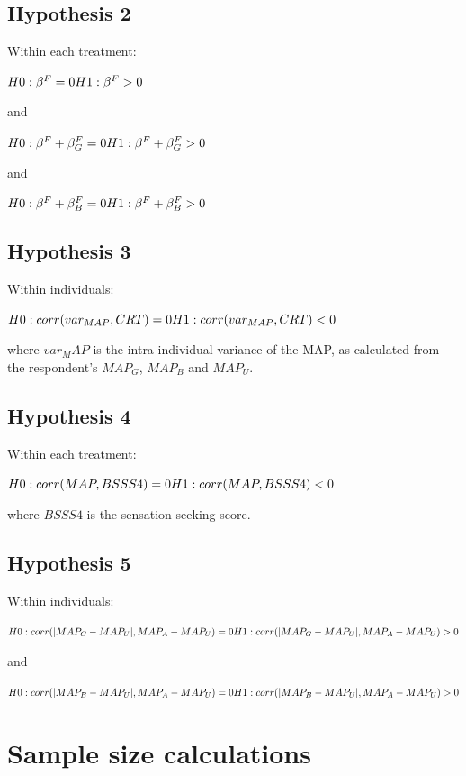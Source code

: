 \subsection{Hypothesis 2}
Within each treatment:

\noindent $H0: \beta^F = 0 \\
H1: \beta^F > 0$

\noindent and

\noindent $H0: \beta^F + \beta_G^F = 0 \\
H1: \beta^F + \beta_G^F > 0$

\noindent and

\noindent $H0: \beta^F + \beta_B^F = 0 \\
H1: \beta^F + \beta_B^F > 0$

\subsection{Hypothesis 3}
Within individuals:

\noindent $H0: corr(var_{MAP},CRT) = 0 \\
H1: corr(var_{MAP},CRT) < 0$

\noindent where $var_MAP$ is the intra-individual variance of the MAP, as calculated from the respondent's $MAP_G$, $MAP_B$ and $MAP_U$.

\subsection{Hypothesis 4}
Within each treatment:

\noindent $H0: corr(MAP,BSSS4) = 0 \\
H1: corr(MAP,BSSS4) < 0$

\noindent where $BSSS4$ is the sensation seeking score.

\subsection{Hypothesis 5}
Within individuals:

\noindent $H0: corr(|MAP_G - MAP_U|,MAP_A - MAP_U) = 0 \\
H1: corr(|MAP_G - MAP_U|,MAP_A - MAP_U) > 0$

\noindent and

\noindent $H0: corr(|MAP_B - MAP_U|,MAP_A - MAP_U) = 0 \\
H1: corr(|MAP_B - MAP_U|,MAP_A - MAP_U) > 0$



\section{Sample size calculations}
\label{section:appendixc}
\setcounter{figure}{0}
\setcounter{table}{0}
\renewcommand{\thefigure}{C.\arabic{figure}}
\renewcommand{\thetable}{C.\arabic{table}}

